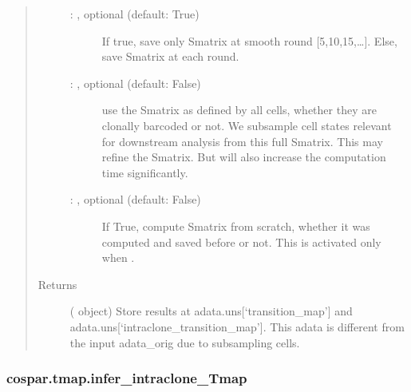 \documentclass[letterpaper,10pt,english]{sphinxmanual}
\begin{document}
\begin{fulllineitems}
\begin{quote}
\begin{description}
\begin{description}
\item[{ : , optional (default: True)}] \leavevmode
If true, save only Smatrix at smooth round {[}5,10,15,…{]}.
Else, save Smatrix at each round.

\item[{ : , optional (default: False)}] \leavevmode
use the Smatrix as defined by all cells, whether they are clonally
barcoded or not. We sub\sphinxhyphen{}sample cell states relevant for downstream
analysis from this full Smatrix. This may refine the Smatrix.
But will also increase the computation time significantly.

\item[{ : , optional (default: False)}] \leavevmode
If True, compute Smatrix from scratch, whether it was
computed and saved before or not. This is activated only when
.

\end{description}

\item[{Returns}] \leavevmode
{} ( object) \textendash{} Store results at adata.uns{[}‘transition\_map’{]}
and adata.uns{[}‘intraclone\_transition\_map’{]}. This adata is different
from the input adata\_orig due to subsampling cells.

\end{description}\end{quote}

\end{fulllineitems}



\subsubsection{cospar.tmap.infer\_intraclone\_Tmap}
\label{\detokenize{cospar.tmap.infer_intraclone_Tmap:cospar-tmap-infer-intraclone-tmap}}\label{\detokenize{cospar.tmap.infer_intraclone_Tmap::doc}}
\end{document}
